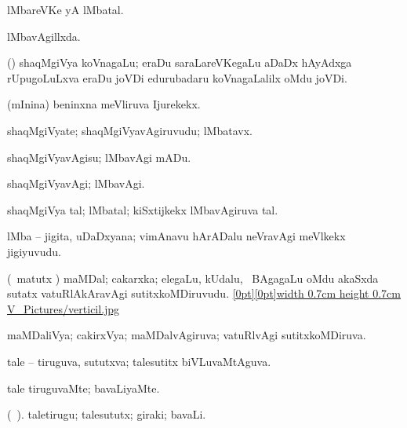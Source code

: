 {{{{\bentry
{} 
\gl{\nA}
\expl{}
\bmng
lMbareVKe yA lMbatal. 
\emng

\noindent 
\gl{\pagu}
\expl{}
\bmng
  lMbavAgillxda. 
\emng
\eentry

\bentry
{}
\gl{\nA}
\expl{}
\bmng
 (\ga) shaqMgiVya koVnagaLu; eraDu saraLareVKegaLu aDaDx hAyAdxga rUpugoLuLxva eraDu joVDi edurubadaru koVnagaLalilx oMdu joVDi. 
\emng
\eentry

\bentry
{}
\gl{\nA}
\expl{}
\bmng
 (mInina) beninxna meVliruva Ijurekekx. 
\emng
\eentry

\bentry
{}
\gl{\nA}
\expl{}
\bmng
 shaqMgiVyate; shaqMgiVyavAgiruvudu; lMbatavx. 
\emng
\eentry

\bentry
{} 
\gl{\sakirx}
\expl{}
\bmng
 shaqMgiVyavAgisu; lMbavAgi mADu. 
\emng
\eentry

\bentry
{} 
\gl{\kirxvi}
\expl{}
\bmng
 shaqMgiVyavAgi; lMbavAgi. 
\emng
\eentry

\bentry
{} 
\gl{\nA}
\expl{}
\bmng
 shaqMgiVya tal; lMbatal; kiSxtijkekx lMbavAgiruva tal. 
\emng
\eentry

\bentry
{}
\gl{\nA}
\expl{}
\bmng
 lMba -- jigita, uDaDxyana; vimAnavu hArADalu neVravAgi meVlkekx jigiyuvudu. 
\emng
\eentry

\bentry
{} 
\gl{\nA}
\bmng
 (\pArxvi\ matutx \savi) maMDal; cakarxka; elegaLu, kUdalu, \mo\ BAgagaLu oMdu akaSxda sutatx vatuRlAkAravAgi sutitxkoMDiruvudu. \quad \hyperlink{verticilfigure}{\raisebox{-0.15cm}[0pt][0pt]{\pdfimage width 0.7cm height 0.7cm {V_Pictures/verticil.jpg}}} 
\emng
\eentry

\bentry
{} 
\gl{\gu}
\expl{}
\bmng
 maMDaliVya; cakirxVya; maMDalvAgiruva; vatuRlvAgi sutitxkoMDiruva. 
\emng
\eentry

\bentry
{} 
\gl{\gu}
\expl{}
\bmng
 tale -- tiruguva, sututxva; talesutitx biVLuvaMtAguva. 
\emng
\eentry

\bentry
{} 
\gl{\kirxvi}
\expl{}
\bmng
 tale tiruguvaMte; bavaLiyaMte. 
\emng
\eentry

\bentry
{} 
\gl{\nA}(\bava\ ). 
\bmng
 taletirugu; talesututx; giraki; bavaLi. 
\emng
\eentry

}}}}
